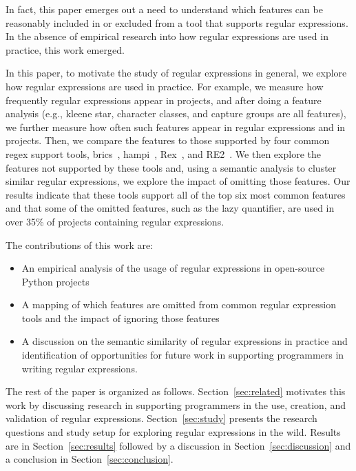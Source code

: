 In fact, this paper emerges out a need to understand which features can be reasonably included in or excluded from a tool that supports regular expressions. In the absence of empirical research into how regular expressions are used in practice, this work emerged.

In this paper, to motivate the study of regular expressions in general, we explore how regular expressions are used in practice. For example, we measure how frequently regular expressions appear in projects, and after doing a feature analysis (e.g., kleene star, character classes, and capture groups are all features), we further measure how often such features appear in regular expressions and in projects. Then, we compare the features to those supported by four common regex support tools, brics~\cite{brics}, hampi~\cite{hampi}, Rex~\cite{rex}, and RE2~\cite{re2}. We then explore the features not supported by these tools and, using a semantic analysis to cluster similar regular expressions, we explore the impact of omitting those features. Our results indicate that these tools support all of the top six most common features and that some of the omitted features, such as the lazy quantifier, are used in over 35\% of projects containing regular expressions.

The contributions of this work are:

\begin{itemize}
	\item An empirical analysis of the usage of regular expressions in  open-source Python projects
	\item A mapping of which features are omitted from common regular expression tools and the impact of ignoring those features
	\item A discussion on the semantic similarity of regular expressions in practice and identification of opportunities for future work in supporting programmers in writing regular expressions.
\end{itemize}

The rest of the paper is organized as follows. Section~\ref{sec:related} motivates this work by discussing research in supporting programmers in the use, creation, and validation of regular expressions. Section~\ref{sec:study} presents the research questions and study setup for exploring regular expressions in the wild. Results are in Section~\ref{sec:results} followed by a discussion in Section~\ref{sec:discussion} and a conclusion in Section~\ref{sec:conclusion}.
